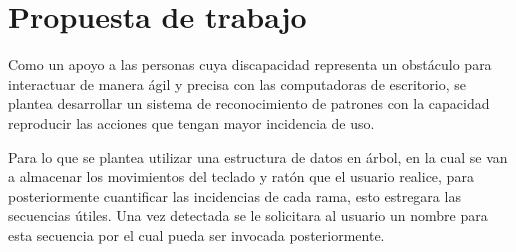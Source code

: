 \section{Propuesta de trabajo}

Como un apoyo a las personas cuya discapacidad representa un obstáculo para
 interactuar de manera ágil y precisa con las computadoras de escritorio, se
 plantea desarrollar un sistema de reconocimiento de patrones con la capacidad
 reproducir las acciones que tengan mayor incidencia de uso. 
 
Para lo que se plantea utilizar una estructura de datos en árbol, en la cual
 se van a almacenar los movimientos del teclado y ratón que el usuario realice,
 para posteriormente cuantificar las incidencias de cada rama, esto estregara
 las secuencias útiles. Una vez detectada se le solicitara al usuario un nombre
 para esta secuencia por el cual pueda ser invocada posteriormente.